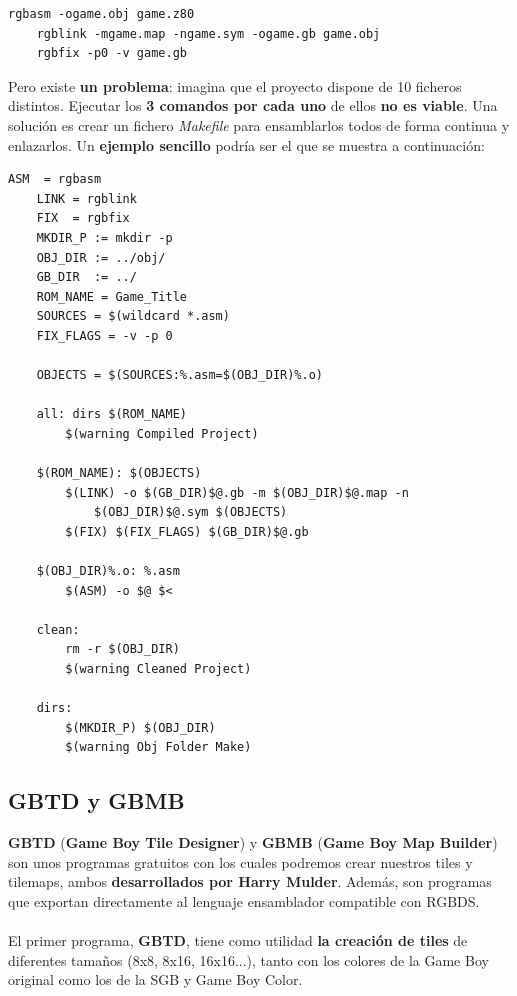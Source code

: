 \begin{lstlisting}[caption={Crear una ROM con RGBDS}, label={code:rgbds}]
    rgbasm -ogame.obj game.z80
    rgblink -mgame.map -ngame.sym -ogame.gb game.obj
    rgbfix -p0 -v game.gb
\end{lstlisting}

Pero existe \textbf{un problema}: imagina que el proyecto dispone de 10 ficheros distintos. Ejecutar los \textbf{3 comandos por cada uno} de ellos \textbf{no es viable}. Una solución es crear un fichero \textit{Makefile} para ensamblarlos todos de forma continua y enlazarlos. Un \textbf{ejemplo sencillo} podría ser el que se muestra a continuación:

\begin{lstlisting}[caption={Makefile básico}, label={code:makefile}]
    ASM  = rgbasm
    LINK = rgblink
    FIX  = rgbfix
    MKDIR_P := mkdir -p
    OBJ_DIR := ../obj/
    GB_DIR  := ../
    ROM_NAME = Game_Title
    SOURCES = $(wildcard *.asm)
    FIX_FLAGS = -v -p 0

    OBJECTS = $(SOURCES:%.asm=$(OBJ_DIR)%.o)
    
    all: dirs $(ROM_NAME)
        $(warning Compiled Project)
    
    $(ROM_NAME): $(OBJECTS)
        $(LINK) -o $(GB_DIR)$@.gb -m $(OBJ_DIR)$@.map -n 
            $(OBJ_DIR)$@.sym $(OBJECTS)
        $(FIX) $(FIX_FLAGS) $(GB_DIR)$@.gb
    
    $(OBJ_DIR)%.o: %.asm
        $(ASM) -o $@ $<
    
    clean:
        rm -r $(OBJ_DIR)
        $(warning Cleaned Project)
    
    dirs: 
        $(MKDIR_P) $(OBJ_DIR)
        $(warning Obj Folder Make)
\end{lstlisting}

\clearpage

\subsection{GBTD y GBMB}

\textbf{GBTD} (\textbf{Game Boy Tile Designer}) y \textbf{GBMB} (\textbf{Game Boy Map Builder}) son unos programas gratuitos con los cuales podremos crear nuestros tiles y tilemaps, ambos \textbf{desarrollados por Harry Mulder}. Además, son programas que exportan directamente al lenguaje ensamblador compatible con RGBDS.
\\ \\
El primer programa, \textbf{GBTD}, tiene como utilidad \textbf{la creación de tiles} de diferentes tamaños (8x8, 8x16, 16x16...), tanto con los colores de la Game Boy original como los de la SGB y Game Boy Color.

